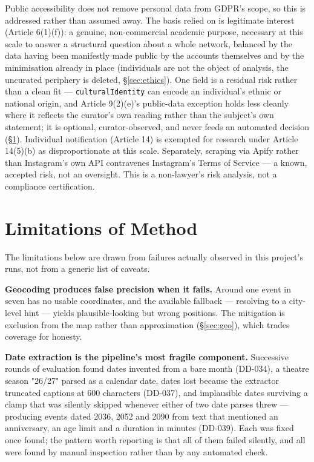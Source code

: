 \documentclass[12pt, a4paper]{report}
\begin{document}
Public accessibility does not remove personal data from GDPR's scope, so
this is addressed rather than assumed away. The basis relied on is
legitimate interest (Article 6(1)(f)): a genuine, non-commercial academic
purpose, necessary at this scale to answer a structural question about a
whole network, balanced by the data having been manifestly made public
by the accounts themselves and by the minimisation already in place
(individuals are not the object of analysis, the uncurated periphery is
deleted, \S\ref{sec:ethics}). One field is a residual risk rather than a
clean fit — \texttt{culturalIdentity} can encode an individual's ethnic
or national origin, and Article 9(2)(e)'s public-data exception holds
less cleanly where it reflects the curator's own reading rather than the
subject's own statement; it is optional, curator-observed, and never
feeds an automated decision (\S\ref{sec:limitations}). Individual
notification (Article 14) is exempted for research under
Article 14(5)(b) as disproportionate at this scale. Separately, scraping
via Apify rather than Instagram's own API contravenes Instagram's Terms
of Service — a known, accepted risk, not an oversight. This is a
non-lawyer's risk analysis, not a compliance certification.

\section{Limitations of Method}
\label{sec:limitations}

The limitations below are drawn from failures actually observed in this
project's runs, not from a generic list of caveats.

\textbf{Geocoding produces false precision when it fails.} Around one
event in seven has no usable coordinates, and the available fallback —
resolving to a city-level hint — yields plausible-looking but wrong
positions. The mitigation is exclusion from the map rather than
approximation (\S\ref{sec:geo}), which trades coverage for honesty.

\textbf{Date extraction is the pipeline's most fragile component.}
Successive rounds of evaluation found dates invented from a bare month
(DD-034), a theatre season "26/27" parsed as a calendar date, dates lost
because the extractor truncated captions at 600 characters (DD-037), and
implausible dates surviving a clamp that was silently skipped whenever
either of two date parses threw — producing events dated 2036, 2052 and
2090 from text that mentioned an anniversary, an age limit and a duration
in minutes (DD-039). Each was fixed once found; the pattern worth
reporting is that all of them failed silently, and all were found by
manual inspection rather than by any automated check.
\end{document}
